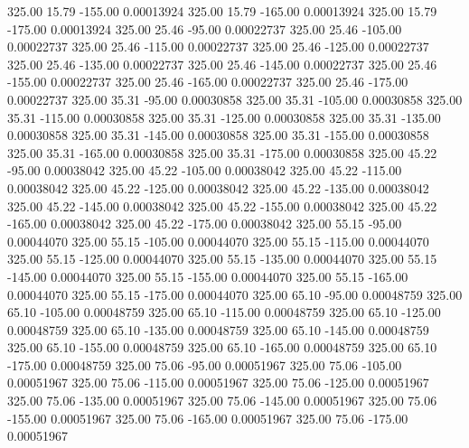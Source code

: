     325.00     15.79   -155.00     0.00013924
    325.00     15.79   -165.00     0.00013924
    325.00     15.79   -175.00     0.00013924
    325.00     25.46    -95.00     0.00022737
    325.00     25.46   -105.00     0.00022737
    325.00     25.46   -115.00     0.00022737
    325.00     25.46   -125.00     0.00022737
    325.00     25.46   -135.00     0.00022737
    325.00     25.46   -145.00     0.00022737
    325.00     25.46   -155.00     0.00022737
    325.00     25.46   -165.00     0.00022737
    325.00     25.46   -175.00     0.00022737
    325.00     35.31    -95.00     0.00030858
    325.00     35.31   -105.00     0.00030858
    325.00     35.31   -115.00     0.00030858
    325.00     35.31   -125.00     0.00030858
    325.00     35.31   -135.00     0.00030858
    325.00     35.31   -145.00     0.00030858
    325.00     35.31   -155.00     0.00030858
    325.00     35.31   -165.00     0.00030858
    325.00     35.31   -175.00     0.00030858
    325.00     45.22    -95.00     0.00038042
    325.00     45.22   -105.00     0.00038042
    325.00     45.22   -115.00     0.00038042
    325.00     45.22   -125.00     0.00038042
    325.00     45.22   -135.00     0.00038042
    325.00     45.22   -145.00     0.00038042
    325.00     45.22   -155.00     0.00038042
    325.00     45.22   -165.00     0.00038042
    325.00     45.22   -175.00     0.00038042
    325.00     55.15    -95.00     0.00044070
    325.00     55.15   -105.00     0.00044070
    325.00     55.15   -115.00     0.00044070
    325.00     55.15   -125.00     0.00044070
    325.00     55.15   -135.00     0.00044070
    325.00     55.15   -145.00     0.00044070
    325.00     55.15   -155.00     0.00044070
    325.00     55.15   -165.00     0.00044070
    325.00     55.15   -175.00     0.00044070
    325.00     65.10    -95.00     0.00048759
    325.00     65.10   -105.00     0.00048759
    325.00     65.10   -115.00     0.00048759
    325.00     65.10   -125.00     0.00048759
    325.00     65.10   -135.00     0.00048759
    325.00     65.10   -145.00     0.00048759
    325.00     65.10   -155.00     0.00048759
    325.00     65.10   -165.00     0.00048759
    325.00     65.10   -175.00     0.00048759
    325.00     75.06    -95.00     0.00051967
    325.00     75.06   -105.00     0.00051967
    325.00     75.06   -115.00     0.00051967
    325.00     75.06   -125.00     0.00051967
    325.00     75.06   -135.00     0.00051967
    325.00     75.06   -145.00     0.00051967
    325.00     75.06   -155.00     0.00051967
    325.00     75.06   -165.00     0.00051967
    325.00     75.06   -175.00     0.00051967
